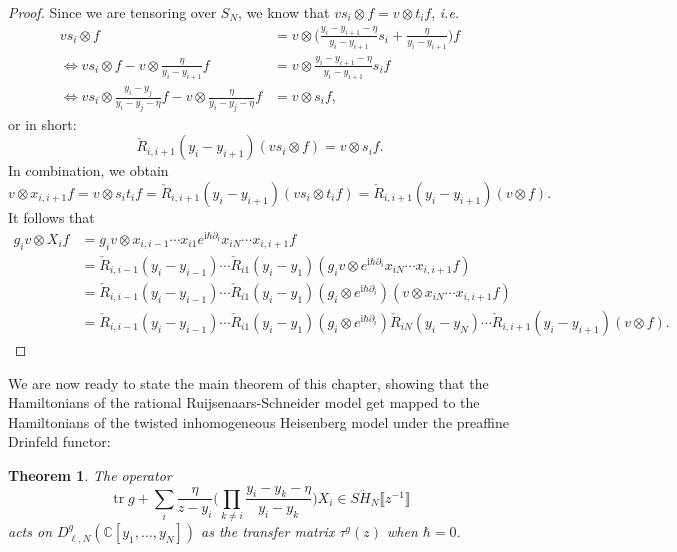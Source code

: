 \documentclass[11pt]{report}
\newtheorem{theorem}{Theorem}[section]
\theoremstyle{definition}
\theoremstyle{remark}
\theoremstyle{remark}
\newcommand{\C}{\mathbb{C}}
\newcommand{\I}{\mathrm{i}}
\begin{document}
\begin{proof}
Since we are tensoring over $S_N$, we know that $v s_i \otimes f = v \otimes t_i f$, \emph{i.e.}
\begin{align*}
vs_i  \otimes f &= v \otimes \bigg( \frac{y_i-y_{i+1}-\eta}{y_i-y_{i+1}} s_i + \frac{\eta}{y_i-y_{i+1}} \bigg) f \\
\Leftrightarrow v s_i \otimes f - v \otimes \frac{\eta}{y_i-y_{i+1}} f &= v \otimes \frac{y_i-y_{i+1}-\eta}{y_i-y_{i+1}} s_i f \\
\Leftrightarrow v s_i \otimes \frac{y_i-y_j}{y_i-y_j-\eta} f - v \otimes \frac{\eta}{y_i-y_j-\eta} f &= v \otimes s_i f,
\end{align*}
or in short:
\begin{equation*}
\check R_{i,i+1}(y_i-y_{i+1}) (v s_i \otimes f) = v \otimes s_i f.
\end{equation*}
In combination, we obtain
\begin{equation*}
v \otimes x_{i,i+1} f = v \otimes s_i t_i f = \check R_{i,i+1}(y_i-y_{i+1}) (v s_i \otimes t_i f) = \check R_{i,i+1}(y_i-y_{i+1})(v \otimes f).
\end{equation*}
It follows that
\begin{align*}
g_i v \otimes X_i f
&= g_i v \otimes x_{i,i-1} \cdots x_{i1} e^{\I \hbar \partial_i} x_{iN} \cdots x_{i,i+1} f \\
&= \check R_{i,i-1}(y_i-y_{i-1}) \cdots \check R_{i1}(y_i-y_1) (g_i v \otimes e^{\I \hbar \partial_i} x_{iN} \cdots x_{i,i+1} f) \\
&= \check R_{i,i-1}(y_i-y_{i-1}) \cdots \check R_{i1}(y_i-y_1) (g_i \otimes e^{\I \hbar \partial_i}) (v \otimes x_{iN} \cdots x_{i,i+1} f) \\
&= \check R_{i,i-1}(y_i-y_{i-1}) \cdots \check R_{i1}(y_i-y_1) (g_i \otimes e^{\I \hbar \partial_i}) \check R_{iN}(y_i-y_N) \cdots \check R_{i,i+1}(y_i-y_{i+1}) (v \otimes f).
\end{align*}
\end{proof}

We are now ready to state the main theorem of this chapter, showing that the Hamiltonians of the rational Ruijsenaars-Schneider model get mapped to the Hamiltonians of the twisted inhomogeneous Heisenberg model under the preaffine Drinfeld functor:

\begin{theorem}
The operator
\begin{equation*}
\operatorname{tr} g + \sum_i \frac{\eta}{z-y_i} \bigg( \prod_{k \neq i} \frac{y_i-y_k-\eta}{y_i-y_k} \bigg) X_i \in S\ddot H_N\llbracket z^{-1} \rrbracket
\end{equation*}
acts on $D_{\ell,N}^g(\C[y_1,...,y_N])$ as the transfer matrix $\tau^g(z)$ when $\hbar = 0$.
\end{theorem}
\end{document}
